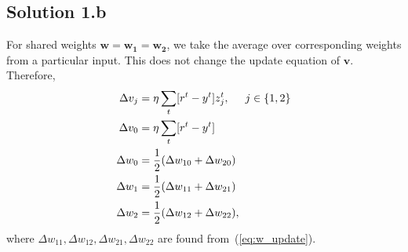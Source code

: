 \subsection*{Solution 1.b}
For shared weights $\boldsymbol{w} = \boldsymbol{w_1} = \boldsymbol{w_2}$, we take the average over corresponding weights from a particular input. This does not change the update equation of $\boldsymbol{v}$. Therefore,
\begin{equation}
	\begin{split}
		\Delta v_j 	&= \eta \sum_{t} [r^t - y^t]z_j^t,\hspace*{0.5cm} j\in \{1,2\}\\
		\Delta v_0	&= \eta \sum_{t} [r^t - y^t]\\
		\Delta w_0	&= \frac{1}{2}(\Delta w_{10} + \Delta w_{20})\\
		\Delta w_1 &= \frac{1}{2}(\Delta w_{11} + \Delta w_{21})\\
		\Delta w_2 &= \frac{1}{2}(\Delta w_{12} + \Delta w_{22}),
	\end{split}
\end{equation}
where $\Delta w_{11}, \Delta w_{12}, \Delta w_{21}, \Delta w_{22}$ are found from~(\ref{eq:w_update}).

